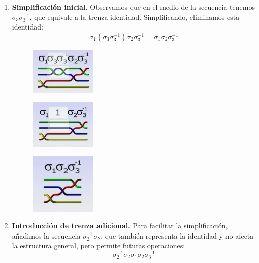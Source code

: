 \begin{enumerate}
    \item \textbf{Simplificación inicial.} Observamos que en el medio de la secuencia tenemos \(\sigma_3 \sigma_3^{-1}\), que equivale a la trenza identidad. Simplificando, eliminamos esta identidad:
    \[
    \sigma_1 (\sigma_3 \sigma_3^{-1}) \sigma_2 \sigma_3^{-1} = \sigma_1 \sigma_2 \sigma_3^{-1}
    \]

    \begin{figure}[h!]
        \centering
        \includegraphics[width=0.3\textwidth]{figures/chapters/2_artin/ejemplo_op_1.png}
        \caption{\cite{esterdalvitBraidsChapter12013}}
    \end{figure}

    \begin{figure}[h!]
        \centering
        \includegraphics[width=0.3\textwidth]{figures/chapters/2_artin/ejemplo_op_2.png}
        \caption{\cite{esterdalvitBraidsChapter12013}}
    \end{figure}

    \begin{figure}[h!]
        \centering
        \includegraphics[width=0.3\textwidth]{figures/chapters/2_artin/ejemplo_op_3.png}
        \caption{\cite{esterdalvitBraidsChapter12013}}
    \end{figure}

    \item \textbf{Introducción de trenza adicional.} Para facilitar la simplificación, añadimos la secuencia \(\sigma_2^{-1} \sigma_2\), que también representa la identidad y no afecta la estructura general, pero permite futuras operaciones:
    \[
    \sigma_2^{-1} \sigma_2 \sigma_1 \sigma_2 \sigma_3^{-1}
    \]


\end{enumerate}
